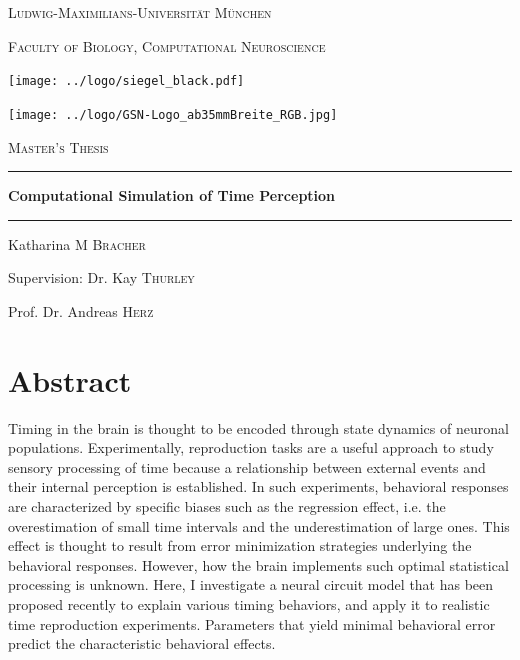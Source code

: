 \documentclass[10pt, a4paper]{article}
\begin{document}

\begin{titlepage}
	\centering
	{\scshape\LARGE Ludwig-Maximilians-Universität München \par}
	{\scshape\large Faculty of Biology, Computational Neuroscience \par}
	\vspace{0.7cm}
	\texttt{[image: ../logo/siegel\_black.pdf]}\par
	\texttt{[image: ../logo/GSN-Logo\_ab35mmBreite\_RGB.jpg]}\par
	\vspace{0.5cm}

	{\scshape\LARGE Master's Thesis}
	\rule{\textwidth}{1.pt}
	{\huge\bfseries Computational Simulation of Time Perception \par}
	\rule{\textwidth}{1.pt}
	\vspace{0.5cm}

	{\Large Katharina \textsc{M Bracher} \par}
	\vspace{0.7cm}

	{\large Supervision: Dr. Kay \textsc{Thurley} \par}
	{\large Prof. Dr. Andreas \textsc{Herz} \par}
\end{titlepage}

\normalsize
\section*{Abstract}
Timing in the brain is thought to be encoded through state dynamics of neuronal populations.
Experimentally, reproduction tasks are a useful approach to study sensory processing of time because a relationship between external events and their internal perception is established.
In such experiments, behavioral responses are characterized by specific biases such as the regression effect, i.e. the overestimation of small time intervals and the underestimation of large ones.
This effect is thought to result from error minimization strategies underlying the behavioral responses.
However, how the brain implements such optimal statistical processing is unknown.
Here, I investigate a neural circuit model that has been proposed recently to explain various timing behaviors, and apply it to realistic time reproduction experiments.  
Parameters that yield minimal behavioral error predict the characteristic behavioral effects. 
\end{document}
